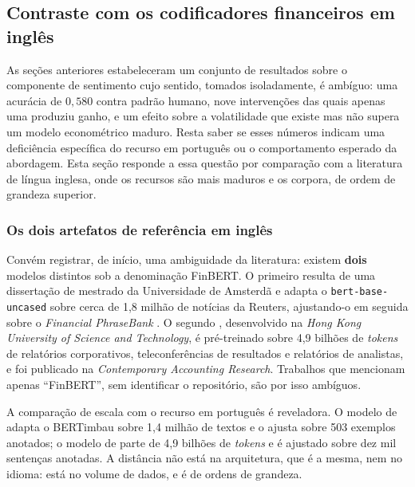 \subsection{Contraste com os codificadores financeiros em inglês}
\label{sec:contraste_ingles}

As seções anteriores estabeleceram um conjunto de resultados sobre o componente de sentimento cujo
sentido, tomados isoladamente, é ambíguo: uma acurácia de $0{,}580$ contra padrão humano, nove
intervenções das quais apenas uma produziu ganho, e um efeito sobre a volatilidade que existe mas
não supera um modelo econométrico maduro. Resta saber se esses números indicam uma deficiência
específica do recurso em português ou o comportamento esperado da abordagem. Esta seção responde a
essa questão por comparação com a literatura de língua inglesa, onde os recursos são mais maduros e
os corpora, de ordem de grandeza superior.

\subsubsection{Os dois artefatos de referência em inglês}

Convém registrar, de início, uma ambiguidade da literatura: existem \textbf{dois} modelos distintos
sob a denominação FinBERT. O primeiro \cite{araci_finbert_2019} resulta de uma dissertação de
mestrado da Universidade de Amsterdã e adapta o \texttt{bert-base-uncased} sobre cerca de 1,8 milhão
de notícias da Reuters, ajustando-o em seguida sobre o \textit{Financial PhraseBank}
\cite{malo_good_2014}. O segundo \cite{yang_finbert_2020,huang_finbert_2023}, desenvolvido na
\textit{Hong Kong University of Science and Technology}, é pré-treinado sobre 4,9 bilhões de
\textit{tokens} de relatórios corporativos, teleconferências de resultados e relatórios de
analistas, e foi publicado na \textit{Contemporary Accounting Research}. Trabalhos que mencionam
apenas ``FinBERT'', sem identificar o repositório, são por isso ambíguos.

A comparação de escala com o recurso em português é reveladora. O modelo de
 adapta o BERTimbau sobre 1,4 milhão de textos e o ajusta sobre 503
exemplos anotados; o modelo de  parte de 4,9 bilhões de
\textit{tokens} e é ajustado sobre dez mil sentenças anotadas. A distância não está na arquitetura,
que é a mesma, nem no idioma: está no volume de dados, e é de ordens de grandeza.

